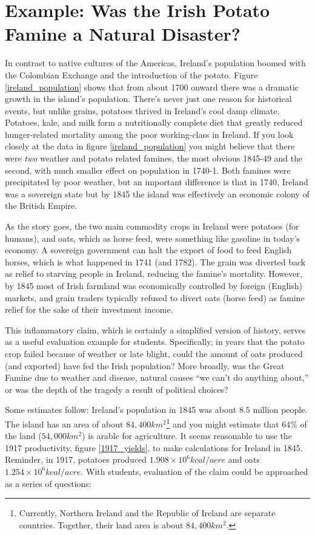 \documentclass[onecolumn]{article}
\begin{document}
\section{Example: Was the Irish Potato Famine a Natural Disaster?}
In contrast to native cultures of the Americas, Ireland's population boomed with the Colombian Exchange and the introduction of the potato. \cite{little_ice_age,potato}
Figure \ref{ireland_population} shows that from about 1700 onward there was a dramatic growth in the island's population.  There's never just one reason for historical events, but unlike grains, potatoes thrived in Ireland's cool damp climate. Potatoes, kale, and milk form a nutritionally complete diet that greatly reduced hunger-related mortality among the poor working-class in Ireland.  If you look closely at the data in figure \ref{ireland_population} you might believe that there were \textit{two} weather and potato related famines, the most obvious 1845-49 and the second, with much smaller effect on population in 1740-1.  Both famines were precipitated by poor weather, but an important difference is that in 1740, Ireland was a sovereign state but by 1845 the island was effectively an economic colony of the British Empire. \cite{little_ice_age}

As the story goes, the two main commodity crops in Ireland were potatoes (for humans), and oats, which as horse feed, were something like gasoline in today's economy.  A sovereign government can halt the export of food to feed English horses, which is what happened in 1741 (and 1782). The grain was diverted back as relief to starving people in Ireland, reducing the famine's mortality. However, by 1845 most of Irish farmland was economically controlled by foreign (English) markets, and grain traders typically refused to divert oats (horse feed) as famine relief for the sake of their investment income.

This inflammatory claim, which is certainly a simplified version of history, serves as a useful evaluation example for students. Specifically, in years that the potato crop failed because of weather or late blight, could the amount of oats produced (and exported) have fed the Irish population?  More broadly, was the Great Famine due to weather and disease, natural causes ``we can't do anything about,''  or was the depth of the tragedy a result of political choices?

Some estimates follow:  Ireland's population in 1845 was about $8.5$ million people.  The island has an area of about $84,400km^2$\footnote{
Currently, Northern Ireland and the Republic of Ireland are separate countries.  Together, their land area is about $84,400km^2$.
}
and you might estimate that $64\%$ of the land ($54,000km^2$) is arable for agriculture.\cite{arable_percentage}
It seems reasonable to use the 1917 productivity,  figure \ref{1917_yields},  to make calculations for Ireland in 1845.  Reminder, in 1917, potatoes produced $1.908\times10^6 kcal/acre$ and oats $1.254\times10^6kcal/acre$.
With students, evaluation of the claim could be approached as a series of questions:
\end{document}
